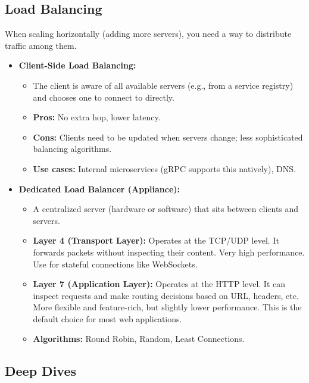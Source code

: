 \documentclass{article}
\begin{document}
\subsection{Load Balancing}
When scaling horizontally (adding more servers), you need a way to distribute traffic among them.
\begin{itemize}
    \item \textbf{Client-Side Load Balancing:}
    \begin{itemize}
        \item The client is aware of all available servers (e.g., from a service registry) and chooses one to connect to directly.
        \item \textbf{Pros:} No extra hop, lower latency.
        \item \textbf{Cons:} Clients need to be updated when servers change; less sophisticated balancing algorithms.
        \item \textbf{Use cases:} Internal microservices (gRPC supports this natively), DNS.
    \end{itemize}
    \item \textbf{Dedicated Load Balancer (Appliance):}
    \begin{itemize}
        \item A centralized server (hardware or software) that sits between clients and servers.
        \item \textbf{Layer 4 (Transport Layer):} Operates at the TCP/UDP level. It forwards packets without inspecting their content. Very high performance. Use for stateful connections like WebSockets.
        \item \textbf{Layer 7 (Application Layer):} Operates at the HTTP level. It can inspect requests and make routing decisions based on URL, headers, etc. More flexible and feature-rich, but slightly lower performance. This is the default choice for most web applications.
        \item \textbf{Algorithms:} Round Robin, Random, Least Connections.
    \end{itemize}
\end{itemize}

\subsection{Deep Dives}
\end{document}
